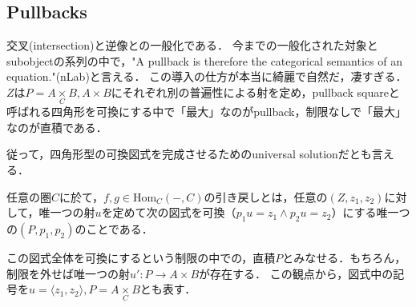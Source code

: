 \documentclass[uplatex, dvipdfmx]{jsarticle}
\begin{document}
\subsection{Pullbacks}
交叉(intersection)と逆像との一般化である．
今までの一般化された対象とsubobjectの系列の中で，"A pullback is therefore the categorical semantics of an equation."(nLab)と言える．
この導入の仕方が本当に綺麗で自然だ，凄すぎる．$Z$は$P=A\underset{C}{\times}B,A\times B$にそれぞれ別の普遍性による射を定め，pullback squareと呼ばれる四角形を可換にする中で「最大」なのがpullback，制限なしで「最大」なのが直積である．
\begin{center}
\end{center}
従って，四角形型の可換図式を完成させるためのuniversal solutionだとも言える．

\begin{definition}[引き戻し]
    任意の圏$C$に於て，$f,g\in\mathrm{Hom}_C(-,C)$の引き戻しとは，任意の$(Z,z_1,z_2)$に対して，唯一つの射$u$を定めて次の図式を可換（$p_1u=z_1\land p_2u=z_2$）にする唯一つの$(P,p_1,p_2)$のことである．
    \begin{center}
    \end{center}
    この図式全体を可換にするという制限の中での，直積$P$とみなせる．もちろん，制限を外せば唯一つの射$u':P\to A\times B$が存在する．
    この観点から，図式中の記号を$u=\langle z_1,z_2\rangle, P=A\underset{C}{\times}B$とも表す．
\end{definition}
\end{document}
